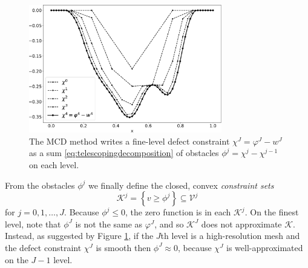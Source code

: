 \documentclass[letterpaper,final,12pt,reqno]{amsart}
\theoremstyle{claim}
\numberwithin{equation}{section}
\numberwithin{figure}{section}
\numberwithin{table}{section}
\numberwithin{theorem}{section}
\begin{document}
\begin{figure}
\includegraphics[width=0.75\textwidth]{fixfigs/decomp_defect.pdf}
\caption{The MCD method writes a fine-level defect constraint $\chi^J = \varphi^J - w^J$ as a sum \eqref{eq:telescopingdecomposition} of obstacles $\phi^j = \chi^j - \chi^{j-1}$ on each level.}
\label{fig:gooddecomposition}
\end{figure}

From the obstacles $\phi^j$ we finally define the closed, convex \emph{constraint sets}
\begin{equation}
\mathcal{K}^j = \left\{v \ge \phi^j\right\} \subseteq \mathcal{V}^j \label{eq:defineKj}
\end{equation}
for $j=0,1,\dots,J$.  Because $\phi^j \le 0$, the zero function is in each $\mathcal{K}^j$.  On the finest level, note that $\phi^J$ is not the same as $\varphi^J$, and so $\mathcal{K}^J$ does not approximate $\mathcal{K}$.  Instead, as suggested by Figure \ref{fig:gooddecomposition}, if the $J$th level is a high-resolution mesh and the defect constraint $\chi^J$ is smooth then $\phi^J\approx 0$, because $\chi^J$ is well-approximated on the $J-1$ level.
\end{document}
